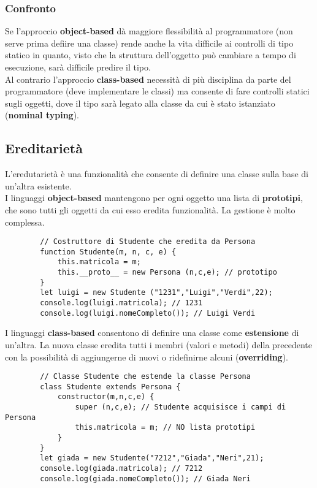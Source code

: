 \subsubsection{Confronto}
Se l'approccio \textbf{object-based} dà maggiore flessibilità al programmatore (non serve prima defiire una classe) rende anche la vita difficile ai controlli di tipo statico in quanto, visto che la struttura dell'oggetto può cambiare a tempo di esecuzione, sarà difficile predire il tipo.\\
Al contrario l'approccio \textbf{class-based} necessità di più disciplina da parte del programmatore (deve implementare le classi) ma consente di fare controlli statici sugli oggetti, dove il tipo sarà legato alla classe da cui è stato istanziato (\textbf{nominal typing}).

\subsection{Ereditarietà}
L'eredutarietà è una funzionalità che consente di definire una classe sulla base di un'altra esistente.\\
I linguaggi \textbf{object-based} mantengono per ogni oggetto una lista di \textbf{prototipi}, che sono tutti gli oggetti da cui esso eredita funzionalità. La gestione è molto complessa.
\begin{example}[Prototipi]
	\begin{lstlisting}
		// Costruttore di Studente che eredita da Persona
		function Studente(m, n, c, e) {
			this.matricola = m;
			this.__proto__ = new Persona (n,c,e); // prototipo
		}
		let luigi = new Studente ("1231","Luigi","Verdi",22);
		console.log(luigi.matricola); // 1231
		console.log(luigi.nomeCompleto()); // Luigi Verdi
	\end{lstlisting}
\end{example}
I linguaggi \textbf{class-based} consentono di definire una classe come \textbf{estensione} di un'altra. La nuova classe eredita tutti i membri (valori e metodi) della precedente con la possibilità di aggiungerne di nuovi o ridefinirne alcuni (\textbf{overriding}).
\begin{example}[Estensione]
	\begin{lstlisting}
		// Classe Studente che estende la classe Persona
		class Studente extends Persona {
			constructor(m,n,c,e) {
				super (n,c,e); // Studente acquisisce i campi di Persona
				this.matricola = m; // NO lista prototipi
			}
		}
		let giada = new Studente("7212","Giada","Neri",21);
		console.log(giada.matricola); // 7212
		console.log(giada.nomeCompleto()); // Giada Neri
	\end{lstlisting}
\end{example}

